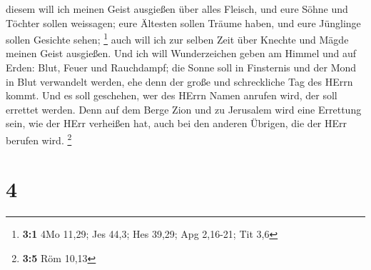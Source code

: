 diesem will ich meinen Geist ausgießen über alles Fleisch, und eure
Söhne und Töchter sollen weissagen; eure Ältesten sollen Träume haben,
und eure Jünglinge sollen Gesichte sehen; \footnote{\textbf{3:1} 4Mo
  11,29; Jes 44,3; Hes 39,29; Apg 2,16-21; Tit 3,6}  auch
will ich zur selben Zeit über Knechte und Mägde meinen Geist ausgießen.
 Und ich will Wunderzeichen geben am Himmel und auf Erden:
Blut, Feuer und Rauchdampf;  die Sonne soll in Finsternis
und der Mond in Blut verwandelt werden, ehe denn der große und
schreckliche Tag des HErrn kommt.  Und es soll geschehen,
wer des HErrn Namen anrufen wird, der soll errettet werden. Denn auf dem
Berge Zion und zu Jerusalem wird eine Errettung sein, wie der HErr
verheißen hat, auch bei den anderen Übrigen, die der HErr berufen wird.
\footnote{\textbf{3:5} Röm 10,13}

\hypertarget{section-2}{%
\section{4}\label{section-2}}

